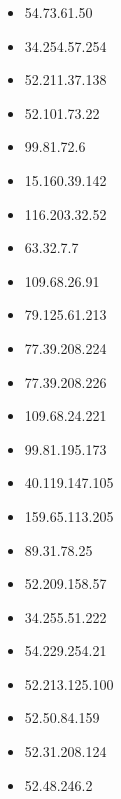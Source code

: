 \documentclass{article}
\begin{document}
\begin{itemize}
        \item 54.73.61.50
    
        \item 34.254.57.254
    
        \item 52.211.37.138
    
        \item 52.101.73.22
    
        \item 99.81.72.6
    
        \item 15.160.39.142
    
        \item 116.203.32.52
    
        \item 63.32.7.7
    
        \item 109.68.26.91
    
        \item 79.125.61.213
    
        \item 77.39.208.224
    
        \item 77.39.208.226
    
        \item 109.68.24.221
    
        \item 99.81.195.173
    
        \item 40.119.147.105
    
        \item 159.65.113.205
    
        \item 89.31.78.25
    
        \item 52.209.158.57
    
        \item 34.255.51.222
    
        \item 54.229.254.21
    
        \item 52.213.125.100
    
        \item 52.50.84.159
    
        \item 52.31.208.124
    
        \item 52.48.246.2
    

\end{itemize}
\end{document}
